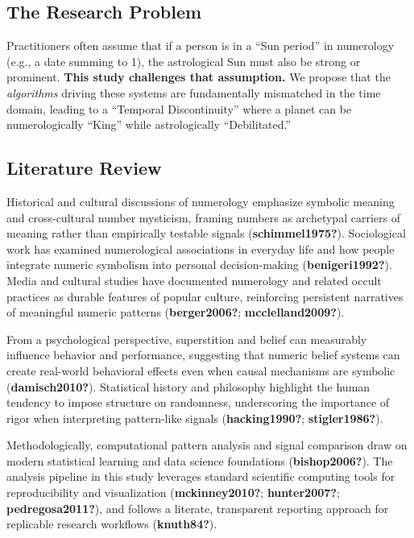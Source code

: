 \documentclass[
  11pt,
  a4paper,
  oneside,
  openany]{article}
\begin{document}
\subsection{The Research Problem}\label{the-research-problem}

Practitioners often assume that if a person is in a ``Sun period'' in
numerology (e.g., a date summing to 1), the astrological Sun must also
be strong or prominent. \textbf{This study challenges that assumption.}
We propose that the \emph{algorithms} driving these systems are
fundamentally mismatched in the time domain, leading to a ``Temporal
Discontinuity'' where a planet can be numerologically ``King'' while
astrologically ``Debilitated.''

\subsection{Literature Review}\label{literature-review}

Historical and cultural discussions of numerology emphasize symbolic
meaning and cross-cultural number mysticism, framing numbers as
archetypal carriers of meaning rather than empirically testable signals
(\textbf{schimmel1975?}). Sociological work has examined numerological
associations in everyday life and how people integrate numeric symbolism
into personal decision-making (\textbf{benigeri1992?}). Media and
cultural studies have documented numerology and related occult practices
as durable features of popular culture, reinforcing persistent
narratives of meaningful numeric patterns (\textbf{berger2006?};
\textbf{mcclelland2009?}).

From a psychological perspective, superstition and belief can measurably
influence behavior and performance, suggesting that numeric belief
systems can create real-world behavioral effects even when causal
mechanisms are symbolic (\textbf{damisch2010?}). Statistical history and
philosophy highlight the human tendency to impose structure on
randomness, underscoring the importance of rigor when interpreting
pattern-like signals (\textbf{hacking1990?}; \textbf{stigler1986?}).

Methodologically, computational pattern analysis and signal comparison
draw on modern statistical learning and data science foundations
(\textbf{bishop2006?}). The analysis pipeline in this study leverages
standard scientific computing tools for reproducibility and
visualization (\textbf{mckinney2010?}; \textbf{hunter2007?};
\textbf{pedregosa2011?}), and follows a literate, transparent reporting
approach for replicable research workflows (\textbf{knuth84?}).
\end{document}
